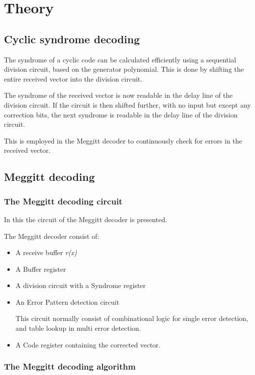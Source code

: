 \documentclass[MiniProjectMain]{subfiles}
\begin{document}
\chapter{Theory}

\section{Cyclic syndrome decoding}
The syndrome of a cyclic code can be calculated efficiently using a sequential division circuit, based on the generator polynomial.
This is done by shifting the entire received vector into the division circuit.

The syndrome of the received vector is now readable in the delay line of the division circuit.
If the circuit is then shifted further, with no input but except any correction bits, the next syndrome is readable in the delay line of the division circuit.

This is employed in the Meggitt decoder to continuously check for errors in the received vector.

\section{Meggitt decoding}

\subsection{The Meggitt decoding circuit}
In this the circuit of the Meggitt decoder is presented.


The Meggitt decoder consist of:
\begin{itemize}
\item
A receive buffer \textit{r(x)}

\item
A Buffer register

\item
A division circuit with a Syndrome register

\item
An Error Pattern detection circuit

\subitem This circuit normally consist of combinational logic for single error detection, and table lookup in multi error detection.

\item
A Code register containing the corrected vector.

\end{itemize}

\subsection{The Meggitt decoding algorithm}
\end{document}
